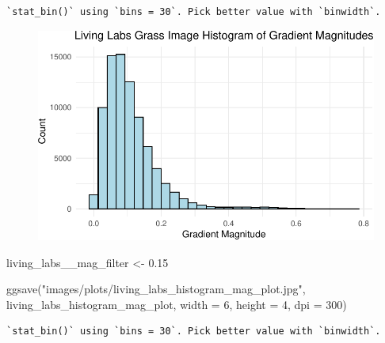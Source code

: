 \documentclass[
  letterpaper,
  DIV=11,
  numbers=noendperiod]{scrreprt}
\newenvironment{Shaded}{\begin{snugshade}}{\end{snugshade}}
\newcommand{\AttributeTok}[1]{\textcolor[rgb]{0.40,0.45,0.13}{#1}}
\newcommand{\DecValTok}[1]{\textcolor[rgb]{0.68,0.00,0.00}{#1}}
\newcommand{\FloatTok}[1]{\textcolor[rgb]{0.68,0.00,0.00}{#1}}
\newcommand{\FunctionTok}[1]{\textcolor[rgb]{0.28,0.35,0.67}{#1}}
\newcommand{\NormalTok}[1]{\textcolor[rgb]{0.00,0.23,0.31}{#1}}
\newcommand{\OtherTok}[1]{\textcolor[rgb]{0.00,0.23,0.31}{#1}}
\newcommand{\StringTok}[1]{\textcolor[rgb]{0.13,0.47,0.30}{#1}}
\begin{document}
\begin{verbatim}
`stat_bin()` using `bins = 30`. Pick better value with `binwidth`.
\end{verbatim}

\begin{figure}[H]

{\centering \includegraphics{results_files/figure-pdf/unnamed-chunk-12-1.pdf}

}

\end{figure}

\begin{Shaded}
\begin{Highlighting}[]
\NormalTok{living\_labs\_\_mag\_filter }\OtherTok{\textless{}{-}} \FloatTok{0.15}

\FunctionTok{ggsave}\NormalTok{(}\StringTok{"images/plots/living\_labs\_histogram\_mag\_plot.jpg"}\NormalTok{, living\_labs\_histogram\_mag\_plot, }\AttributeTok{width =} \DecValTok{6}\NormalTok{, }\AttributeTok{height =} \DecValTok{4}\NormalTok{, }\AttributeTok{dpi =} \DecValTok{300}\NormalTok{)}
\end{Highlighting}
\end{Shaded}

\begin{verbatim}
`stat_bin()` using `bins = 30`. Pick better value with `binwidth`.
\end{verbatim}
\end{document}
